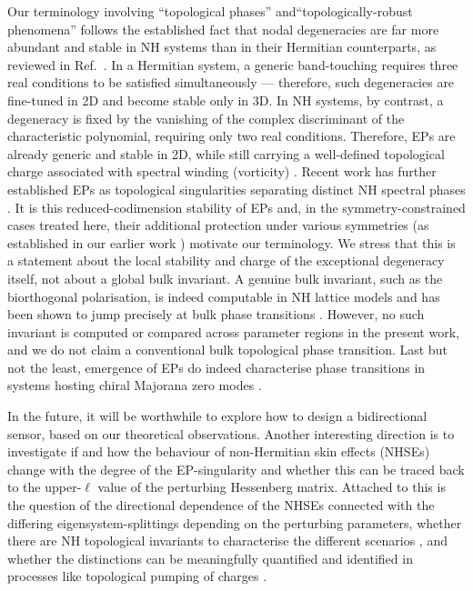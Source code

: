 \documentclass[aps, prb, onecolumn, nofootinbib, citeautoscript, 10pt]{revtex4-2}
\begin{document}
Our terminology involving ``topological phases'' and``topologically-robust phenomena'' follows the established fact that nodal degeneracies are far more abundant and stable in NH systems than in their Hermitian counterparts, as reviewed in Ref.~\cite{emil_review}. In a Hermitian system, a generic band-touching requires three real conditions to be satisfied simultaneously --- therefore, such degeneracies are fine-tuned in 2D and become stable only in 3D. In NH systems, by contrast, a degeneracy is fixed by the vanishing of the complex discriminant of the characteristic polynomial, requiring only two real conditions. Therefore, EPs are already generic and stable in 2D, while still carrying a well-defined topological charge associated with spectral winding (vorticity) \cite{Shen2018, Kawabata2019}. Recent work has further established EPs as topological singularities separating distinct NH spectral phases \cite{flore-elisabet, flore-elisabet0, ips-bp}. It is this reduced-codimension stability of EPs and, in the symmetry-constrained cases treated here, their additional protection under various symmetries (as established in our earlier work \cite{ips-emil}) motivate our terminology. We stress that this is a statement about the local stability and charge of the exceptional degeneracy itself, not about a global bulk invariant. A genuine bulk invariant, such as the biorthogonal polarisation, is indeed computable in NH lattice models and has been shown to jump precisely at bulk phase transitions \cite{flore-elisabet, flore-elisabet0, ips-bp}. However, no such invariant is computed or compared across parameter regions in the present work, and we do not claim a conventional bulk topological phase transition. Last but not the least, emergence of EPs do indeed characterise phase transitions in systems hosting chiral Majorana zero modes \cite{ips-ep-epl, ips-tewari}.

In the future, it will be worthwhile to explore how to design a bidirectional sensor, based on our theoretical observations. Another interesting direction is to investigate if and how the behaviour of non-Hermitian skin effects (NHSEs) \cite{kang-emil, ips-yao-lee} change with the degree of the EP-singularity and whether this can be traced back to the upper-$\ell$ value of the perturbing Hessenberg matrix. Attached to this is the question of the directional dependence of the NHSEs connected with the differing eigensystem-splittings depending on the perturbing parameters, whether there are NH topological invariants to characterise the different scenarios \cite{flore-elisabet0, flore-elisabet, maria_emil, ips-bp}, and whether the distinctions can be meaningfully quantified and identified in processes like topological pumping of charges \cite{zhenming, ips-NH-pumping}.
\end{document}
